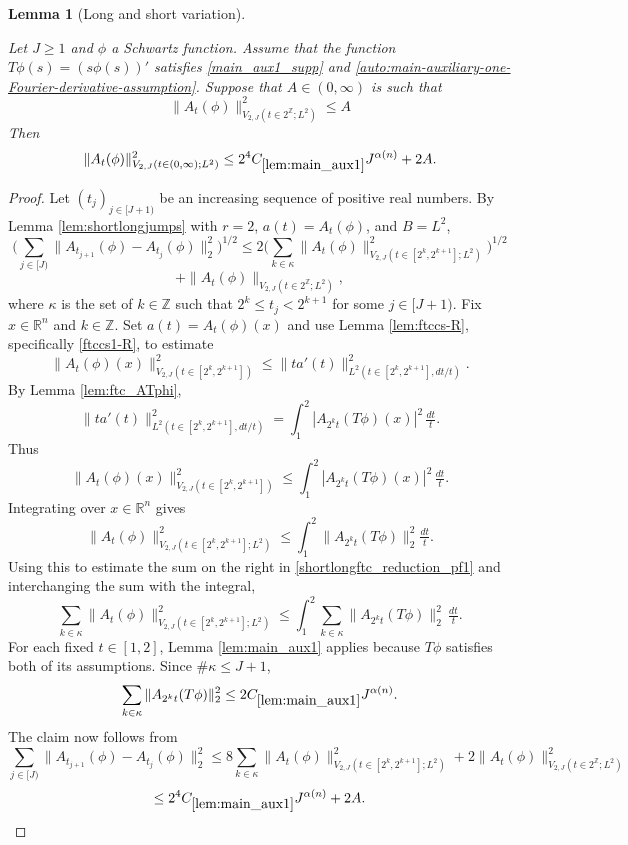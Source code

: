 \documentclass[12pt,reqno]{amsart}
\theoremstyle{plain}
\newtheorem{lemma}[theorem]{Lemma}
\numberwithin{equation}{section}
\theoremstyle{remark}
\newcommand{\uses}[1]{}
\newcommand{\usesdefs}[1]{}
\newcommand{\leanok}{}
\newcommand{\lean}[1]{}
\begin{document}
\begin{lemma}[Long and short variation]\label{lem:shortlongftc_reduction}\uses{lem:shortlongjumps,lem:ftccs-R,lem:ftc_ATphi,lem:main_aux1}\usesdefs{A_def}
\lean{Auto.shortLongFtcReduction}
\leanok
Let $J\ge 1$ and $\phi$ a Schwartz function.
Assume that the function $T\phi(s) = (s \phi(s))'$ satisfies \eqref{main_aux1_supp} and \eqref{auto:main-auxiliary-one-Fourier-derivative-assumption}.
Suppose that $A\in (0,\infty)$ is such that
\begin{equation}\label{shortlongftc_reduction1} \|A_{t}(\phi)\|^2_{V_{2,J}(t\in 2^\mathbb{Z}; L^2)} \le A
\end{equation}
Then
\begin{equation}\label{shortlongftc_reduction2}
\|A_{t}(\phi)\|_{V_{2,J}(t\in (0,\infty); L^2)}^2 \le 2^4 C_{\ref{lem:main_aux1}} J^{\alpha(n)} + 2A.
\end{equation}
\end{lemma}

\begin{proof}
Let $(t_j)_{j\in[J+1)}$ be an increasing sequence of positive real numbers.
By Lemma \ref{lem:shortlongjumps} with $r=2$, $a(t)=A_t(\phi)$, and $B=L^2$,
\begin{equation}\label{shortlongftc_reduction_pf1}
\Big(\sum_{j\in [J)} \|A_{t_{j+1}}(\phi)- A_{t_j}(\phi)\|_2^2\Big)^{1/2}
\le 2 \Big(\sum_{k\in \kappa} \|A_t(\phi)\|_{V_{2,J}(t\in [2^k, 2^{k+1}]; L^2)}^2\Big)^{1/2}
\end{equation}
\begin{equation}\label{shortlongftc_reduction_pf2}
+\|A_t(\phi)\|_{V_{2,J}(t\in 2^\mathbb{Z}; L^2)},
\end{equation}
where $\kappa$ is the set of $k\in \mathbb{Z}$ such that $2^{k}\le t_j<2^{k+1}$ for some $j\in [J+1)$.
Fix $x\in\mathbb{R}^n$ and $k\in\mathbb{Z}$. Set $a(t)=A_t(\phi)(x)$ and use Lemma \ref{lem:ftccs-R}, specifically \eqref{ftccs1-R}, to estimate
\[
\|A_t(\phi)(x)\|_{V_{2,J}(t\in [2^k, 2^{k+1}])}^2
\le
\|ta'(t)\|_{L^2(t\in [2^k, 2^{k+1}],dt/t)}^2.
\]
By Lemma \ref{lem:ftc_ATphi},
\[
\|ta'(t)\|_{L^2(t\in [2^k, 2^{k+1}],dt/t)}^2
=
\int_{1}^2 |A_{2^k t}(T\phi)(x)|^2\,\tfrac{dt}{t}.
\]
Thus
\[
\|A_t(\phi)(x)\|_{V_{2,J}(t\in [2^k, 2^{k+1}])}^2
\le
\int_{1}^2 |A_{2^k t}(T\phi)(x)|^2\,\tfrac{dt}{t}.
\]
Integrating over $x\in\mathbb{R}^n$ gives
\[
\|A_t(\phi)\|_{V_{2,J}(t\in [2^k, 2^{k+1}]; L^2)}^2
\le
\int_1^2 \|A_{2^k t}(T\phi)\|_2^2 \tfrac{dt}{t}.
\]
Using this to estimate the sum on the right in \eqref{shortlongftc_reduction_pf1} and interchanging the sum with the integral,
\[
\sum_{k\in \kappa} \|A_t(\phi)\|_{V_{2,J}(t\in [2^k, 2^{k+1}]; L^2)}^2
\le
\int_1^2 \sum_{k\in\kappa} \|A_{2^k t}(T\phi)\|_2^2\,\tfrac{dt}{t}.
\]
For each fixed $t\in [1,2]$, Lemma \ref{lem:main_aux1} applies because $T\phi$ satisfies both of its assumptions. Since $\#\kappa\le J+1$,
\[
\sum_{k\in\kappa} \|A_{2^k t}(T\phi)\|_2^2
\le 2 C_{\ref{lem:main_aux1}} J^{\alpha(n)}.
\]
The claim now follows from
\[
\sum_{j\in [J)} \|A_{t_{j+1}}(\phi)- A_{t_j}(\phi)\|_2^2
\le 8 \sum_{k\in \kappa} \|A_t(\phi)\|_{V_{2,J}(t\in [2^k, 2^{k+1}]; L^2)}^2
+ 2 \|A_t(\phi)\|_{V_{2,J}(t\in 2^\mathbb{Z}; L^2)}^2
\]
\[
\le 2^4 C_{\ref{lem:main_aux1}} J^{\alpha(n)} + 2A.
\]
\end{proof}
\end{document}
